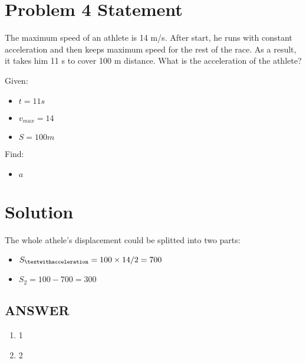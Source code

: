\section*{Problem 4 Statement}

The maximum speed of an athlete is 14 m/s. After start, he runs with constant acceleration and
then keeps maximum speed for the rest of the race. As a result, it takes him 11 s to cover 100 m
distance. What is the acceleration of the athlete?

\bigbreak Given:

\begin{itemize}
    \item $t = 11s$
    \item $v_{max} = 14$
    \item $S = 100m$
\end{itemize}

\bigbreak Find:

\begin{itemize}
    \item $a$
\end{itemize}

\section*{Solution}

The whole athele's displacement could be splitted into two parts:

\begin{itemize}
    \item $S_{\textwithacceleration} = 100 \times 14 / 2 = 700$
    \item $S_2 = 100 - 700 = 300$
\end{itemize}

\vfill \subsection*{ANSWER}
\begin{enumerate}
    \item 1
    \item 2
\end{enumerate}
